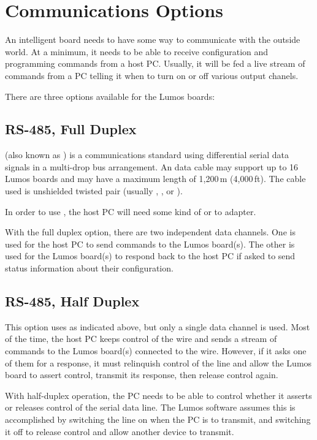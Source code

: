 \documentclass[letterpaper,twoside,onecolumn,openright,final]{memoir}
\begin{document}
\section{Communications Options}
An intelligent board needs to have some way to communicate with the outside world.  At a minimum, it needs
to be able to receive configuration and programming commands from a host PC.  Usually, it will be fed
a live stream of commands from a PC telling it when to turn on or off various output chanels.

There are three options available for the Lumos boards:

\subsection{RS-485, Full Duplex}
 (also known as ) is a communications standard using differential
serial data signals in a multi-drop bus arrangement.  An  data cable may support up to 16
Lumos boards and may have a maximum length of 1,200\,m (4,000\,ft).  The cable used is unshielded
twisted pair (usually , , or ).  

In order to use , the host PC will need some kind of  or  to  adapter.

With the full duplex option, there are two independent data channels.  One is used for the host PC
to send commands to the Lumos board(s).  The other is used for the Lumos board(s) to respond back to
the host PC if asked to send status information about their configuration.


\subsection{RS-485, Half Duplex}
This option uses  as indicated above, but only a single data channel is used.  Most of the time,
the host PC keeps control of the wire and sends a stream of commands to the Lumos board(s) connected
to the wire.  However, if it asks one of them for a response, it must relinquish control of the line
and allow the Lumos board to assert control, transmit its response, then release control again.

With half-duplex operation, the PC needs to be able to control whether it asserts or releases control
of the serial data line.  The Lumos software assumes this is accomplished by switching the  
line on when the PC is to transmit, and switching it off to release control and allow another device to
transmit.
\end{document}
